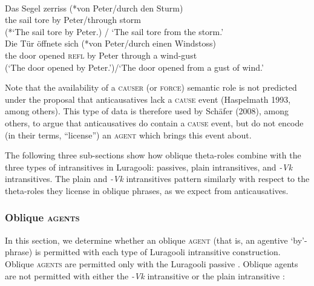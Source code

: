 \documentclass[output=paper]{langsci/langscibook}
\begin{document}
\ex\label{ex:}
\\
\gll   Das Segel zerriss (*von Peter/durch den Sturm)\\
       the  sail    tore        by    Peter/through storm\\
\glt (*‘The sail tore by Peter.) / ‘The sail tore from the storm.’
\ex\label{ex:}
\\
\gll   Die Tür   öffnete sich (*von Peter/durch einen Windstoss)\\
       the door opened \textsc{refl}  by   Peter  through a wind-gust\\
\glt (‘The door opened by Peter.’)/‘The door opened from a gust of wind.’
\z
\z

Note that the availability of a \textsc{causer} (or \textsc{force}) semantic role is not predicted under the proposal that anticausatives lack a\textsc{ cause }event (Haspelmath 1993, among others). This type of data is therefore used by Schäfer (2008), among others, to argue that anticausatives do contain a \textsc{cause} event, but do not encode (in their terms, “license”) an \textsc{agent} which brings this event about. 

The following three sub-sections show how oblique theta-roles combine with the three types of intransitives in Luragooli: passives, plain intransitives, and \textit{-Vk} intransitives. The plain and \textit{-Vk} intransitives pattern similarly with respect to the theta-roles they license in oblique phrases, as we expect from anticausatives.

\subsubsection{Oblique \textsc{agents} }

In this section, we determine whether an oblique \textsc{agent} (that is, an agentive ‘by’-phrase) is permitted with each type of Luragooli intransitive construction. Oblique \textsc{agents} are permitted only with the Luragooli passive . Oblique agents are not permitted with either the \textit{-Vk} intransitive  or the plain intransitive :
\end{document}
